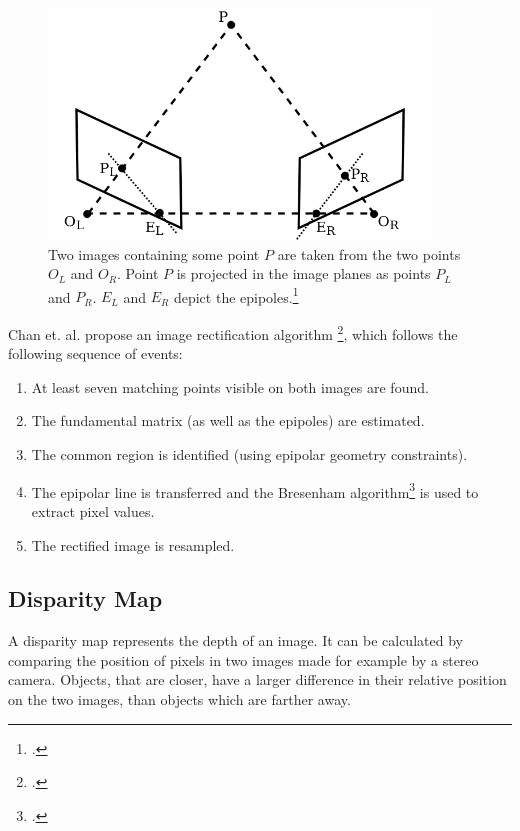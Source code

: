 \begin{figure}[h!]
	\centering
	\includegraphics[width=4in]{img/methodology_stereoCamera_imageRectification.png}
	\caption{Two images containing some point $P$ are taken from the two points $O_L$ and $O_R$. Point $P$ is projected in the image planes as points $P_L$ and $P_R$. $E_L$ and $E_R$ depict the epipoles.\footcite{Wikipedia_ImageRectification}}
	\label{pic:methodology_stereoCamera_imageRectification}
\end{figure}

Chan et. al. propose an image rectification algorithm \footcite{Chen_New_Image_Rectification_Algorithm}, which follows the following sequence of events:

\begin{enumerate}
	\item At least seven matching points visible on both images are found.
	\item The fundamental matrix (as well as the epipoles) are estimated.
	\item The common region is identified (using epipolar geometry constraints).
	\item The epipolar line is transferred and the Bresenham algorithm\footcite{Bresenham_Linear_Algorithm_For_Incremental_Digital_Display_Of_Circular_Arcs} is used to extract pixel values.
	\item The rectified image is resampled.
\end{enumerate}

\subsection{Disparity Map}
A disparity map represents the depth of an image. It can be calculated by comparing the position of pixels in two images made for example by a stereo camera. Objects, that are closer, have a larger difference in their relative position on the two images, than objects which are farther away.

